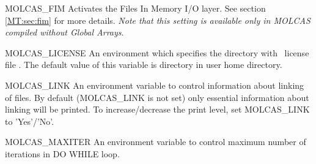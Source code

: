\begin{variablelist}
\item[MOLCAS\_FIM]
Activates the Files In Memory I/O layer. See section \ref{MT:sec:fim} for more details.
{\it Note that this setting is available only in MOLCAS compiled without Global
Arrays}.

\item[MOLCAS\_LICENSE]
An environment which specifies the directory with \molcas\ license file .
The default value of this variable is directory  in user home directory.
\item[MOLCAS\_LINK]
An environment variable to control information about linking of files.
By default (MOLCAS\_LINK is not set) only essential
information about linking will be printed. To increase/decrease the
print level, set MOLCAS\_LINK to 'Yes'/'No'.

\item[MOLCAS\_MAXITER]
An environment variable to control maximum number of iterations in DO WHILE loop.


\end{variablelist}
